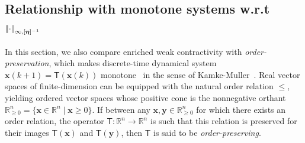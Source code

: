 \documentclass[journal,twoside,web]{ieeecolor}
\newcommand{\norm}[1]{{\left\vert\kern-0.25ex\left\vert #1\right\vert\kern-0.25ex\right\vert}}
\newcommand{\rea }{\mathbb{R}}
\newcommand{\xb}{\boldsymbol{x}}
\newcommand{\yb}{\boldsymbol{y}}
\newcommand{\etab}{\boldsymbol{\eta}}
\newcommand{\Sc}{\mathcal{S}}
\newcommand{\Ls}{\mathsf{L}}
\newcommand{\Ts}{\mathsf{T}}
\newcommand{\Is}{\mathsf{Id}}
\newtheorem{rem}{Remark}
\begin{document}



\subsection{Relationship with monotone systems w.r.t $\norm{\cdot}_{\infty,[\etab]^{-1}}$}

In this section, we also compare enriched weak contractivity with \textit{order-preservation}, which makes discrete-time dynamical system $\xb(k+1)=\Ts(\xb(k))$ monotone~\cite{Angeli03,Deplano23} in the sense of Kamke-Muller~\cite{muller1927fundamentaltheorem,Kamke32}.
%
%
Real vector spaces of finite-dimension can be equipped with the natural order relation $\leq$, yielding ordered vector spaces whose positive cone is the nonnegative orthant ${\mathbb{R}^n_{\geq 0}=\{\xb\in\rea^n\mid \xb\geq 0\}}$.
%
If between any ${\xb,\yb\in\mathbb{R}^n_{\geq 0}}$ for which there exists an order relation, the operator ${\Ts:\rea^n\rightarrow\rea^n}$ is such that this relation is preserved for their images $\Ts(\xb)$ and $\Ts(\yb)$, then $\Ts$ is said to be \emph{order-preserving}.
\end{document}

